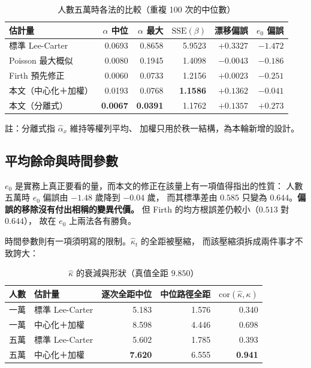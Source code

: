 \documentclass[UTF8, fontset=macnew, a4paper, 12pt]{ctexart}
\begin{document}
\begin{table}[H]
\centering
\caption{人數五萬時各法的比較（重複 100 次的中位數）}
\small
\begin{tabular}{lrrrrr}
\toprule
估計量 & $\alpha$ 中位 & $\alpha$ 最大 & $\mathrm{SSE}(\beta)$ & 漂移偏誤 & $e_0$ 偏誤\\
\midrule
標準 Lee-Carter & 0.0693 & 0.8658 & 5.9523 & $+0.3327$ & $-1.472$\\
Poisson 最大概似 & 0.0080 & 0.1945 & 1.4098 & $-0.0043$ & $-0.186$\\
Firth 預先修正 & 0.0060 & 0.0733 & 1.2156 & $\mathbf{+0.0023}$ & $-0.251$\\
本文（中心化＋加權） & 0.0193 & 0.0768 & \textbf{1.1586} & $+0.1362$ & $\mathbf{-0.041}$\\
本文（分離式） & \textbf{0.0067} & \textbf{0.0391} & 1.1762 & $+0.1357$ & $+0.273$\\
\bottomrule
\end{tabular}

\vspace{2pt}
\parbox{0.92\textwidth}{\footnotesize 註：分離式指 $\hat\alpha_x$ 維持等權列平均、
加權只用於秩一結構，為本輪新增的設計。}
\label{t:main}
\end{table}

\subsection{平均餘命與時間參數}

$e_0$ 是實務上真正要看的量，而本文的修正在該量上有一項值得指出的性質：
人數五萬時 $e_0$ 偏誤由 $-1.48$ 歲降到 $-0.04$ 歲，
而其標準差由 $0.585$ 只變為 $0.644$。\textbf{偏誤的移除沒有付出相稱的變異代價。}
但 Firth 的均方根誤差仍較小（$0.513$ 對 $0.644$），
故在 $e_0$ 上兩法各有勝負。

時間參數則有一項須明寫的限制。$\hat\kappa_t$ 的全距被壓縮，
而該壓縮須拆成兩件事才不致誇大：

\begin{table}[H]
\centering
\caption{$\hat\kappa$ 的衰減與形狀（真值全距 $9.850$）}
\small
\begin{tabular}{llrrr}
\toprule
人數 & 估計量 & 逐次全距中位 & 中位路徑全距 & $\mathrm{cor}(\hat\kappa,\kappa)$\\
\midrule
一萬 & 標準 Lee-Carter & 5.183 & 1.576 & 0.340\\
一萬 & 中心化＋加權 & 8.598 & 4.446 & 0.698\\
五萬 & 標準 Lee-Carter & 5.602 & 1.785 & 0.393\\
五萬 & 中心化＋加權 & \textbf{7.620} & 6.555 & \textbf{0.941}\\
\bottomrule
\end{tabular}
\label{t:kappa}
\end{table}
\end{document}
